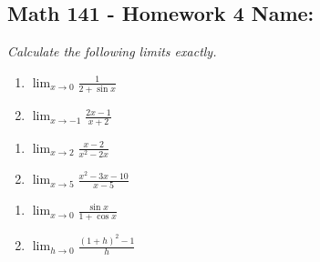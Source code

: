 \documentclass[11pt]{article}
\newcommand{\ds}{\displaystyle}
\begin{document}
\pagestyle{empty}
\subsection*{Math 141 - Homework 4 \hfill Name: \underline{\hspace*{2in}}}

\textit{Calculate the following limits exactly.}
\begin{multicols}{2}
\begin{enumerate}
\item $\ds \lim_{x \rightarrow 0} \frac{1}{2+\sin x}$
\item $\ds \lim_{x \rightarrow -1} \frac{2x-1}{x+2}$
\setcounter{enumCount}{\theenumi}
\end{enumerate}
\end{multicols}
\vfill

\noindent
\begin{multicols}{2}
\begin{enumerate}
\setcounter{enumi}{\theenumCount}
\item $\ds \lim_{x \rightarrow 2} \frac{x-2}{x^2-2x}$
\item $\ds \lim_{x \rightarrow 5} \frac{x^2 - 3x - 10}{x - 5}$
\setcounter{enumCount}{\theenumi}
\end{enumerate}
\end{multicols}
\vfill

\noindent
\begin{multicols}{2}
\begin{enumerate}
\setcounter{enumi}{\theenumCount}
\item $\ds \lim_{x \rightarrow 0} \frac{\sin x}{1+\cos x}$
\item $\ds \lim_{h \rightarrow 0} \frac{(1+h)^2 - 1}{h}$
\setcounter{enumCount}{\theenumi}
\end{enumerate}
\end{multicols}
\vfill
\end{document}

